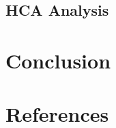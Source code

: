 \documentclass[
  english,
  man]{apa6}
\begin{document}
\hypertarget{hca-analysis}{%
\subsection{HCA Analysis}\label{hca-analysis}}

\hypertarget{conclusion}{%
\section{Conclusion}\label{conclusion}}

\newpage

\hypertarget{references}{%
\section{References}\label{references}}

\begingroup
\setlength{\parindent}{-0.5in}
\setlength{\leftskip}{0.5in}

\hypertarget{refs}{}

\endgroup
\end{document}

